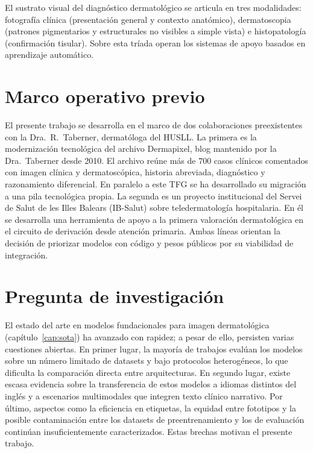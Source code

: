 El sustrato visual del diagnóstico dermatológico se articula en tres
modalidades: fotografía clínica (presentación general y contexto
anatómico), dermatoscopia (patrones pigmentarios y estructurales no
visibles a simple vista) e histopatología (confirmación
tisular). Sobre esta tríada operan los sistemas de apoyo basados en
aprendizaje automático.


\section{Marco operativo previo}
\label{sec:trabajo-previo}

El presente trabajo se desarrolla en el marco de dos colaboraciones
preexistentes con la Dra.~R.~Taberner, dermatóloga del HUSLL. La
primera es la modernización tecnológica del archivo Dermapixel,
blog mantenido por la Dra.~Taberner desde 2010. El archivo reúne
más de $700$ casos clínicos comentados con imagen clínica y
dermatoscópica, historia abreviada, diagnóstico y razonamiento
diferencial. En paralelo a este TFG se ha desarrollado su migración
a una pila tecnológica propia. La segunda es un proyecto
institucional del Servei de Salut de les Illes Balears (IB-Salut)
sobre teledermatología hospitalaria. En él se desarrolla una
herramienta de apoyo a la primera valoración dermatológica en el
circuito de derivación desde atención primaria. Ambas líneas
orientan la decisión de priorizar modelos con código y pesos
públicos por su viabilidad de integración.


\section{Pregunta de investigación}
\label{sec:pregunta}

El estado del arte en modelos fundacionales para imagen
dermatológica (capítulo~\ref{cap:sota}) ha avanzado con rapidez; a
pesar de ello, persisten varias cuestiones abiertas. En primer
lugar, la mayoría de trabajos evalúan los modelos sobre un número
limitado de datasets y bajo protocolos heterogéneos, lo que dificulta
la comparación directa entre arquitecturas. En segundo lugar, existe
escasa evidencia sobre la transferencia de estos modelos a idiomas
distintos del inglés y a escenarios multimodales que integren texto
clínico narrativo. Por último, aspectos como la eficiencia en
etiquetas, la equidad entre fototipos y la posible contaminación
entre los datasets de preentrenamiento y los de evaluación continúan
insuficientemente caracterizados. Estas brechas motivan el presente
trabajo.

